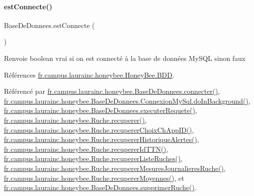 \paragraph{\texorpdfstring{est\+Connecte()}{estConnecte()}}
{\footnotesize\ttfamily Base\+De\+Donnees.\+est\+Connecte (\begin{DoxyParamCaption}{ }\end{DoxyParamCaption})}

\begin{DoxyReturn}{Renvoie}
boolean vrai si on est connecté à la base de données My\+S\+QL sinon faux 
\end{DoxyReturn}


Références \hyperlink{classfr_1_1campus_1_1laurainc_1_1honeybee_1_1_honey_bee_abfb4f6cc1c8bb793c37ccb8408abc51c}{fr.\+campus.\+laurainc.\+honeybee.\+Honey\+Bee.\+B\+DD}.



Référencé par \hyperlink{classfr_1_1campus_1_1laurainc_1_1honeybee_1_1_base_de_donnees_a08564ea7dccde161d6eac4b8879401bb}{fr.\+campus.\+laurainc.\+honeybee.\+Base\+De\+Donnees.\+connecter()}, \hyperlink{classfr_1_1campus_1_1laurainc_1_1honeybee_1_1_base_de_donnees_1_1_connexion_my_sql_a752c9f0f9a0879fceeeabd48c5fcb058}{fr.\+campus.\+laurainc.\+honeybee.\+Base\+De\+Donnees.\+Connexion\+My\+Sql.\+do\+In\+Background()}, \hyperlink{classfr_1_1campus_1_1laurainc_1_1honeybee_1_1_base_de_donnees_a421bffe6f14c01bee64695e7b6a9745d}{fr.\+campus.\+laurainc.\+honeybee.\+Base\+De\+Donnees.\+executer\+Requete()}, \hyperlink{classfr_1_1campus_1_1laurainc_1_1honeybee_1_1_ruche_a7a99d3c585f2c507eb2c6c265a5bb1fe}{fr.\+campus.\+laurainc.\+honeybee.\+Ruche.\+recuperer()}, \hyperlink{classfr_1_1campus_1_1laurainc_1_1honeybee_1_1_ruche_ade5d681bd0a29d84e0d069169b10a38b}{fr.\+campus.\+laurainc.\+honeybee.\+Ruche.\+recuperer\+Choix\+Ch\+App\+I\+D()}, \hyperlink{classfr_1_1campus_1_1laurainc_1_1honeybee_1_1_ruche_ace10a52a470257f2b8f161fc3c7b9f15}{fr.\+campus.\+laurainc.\+honeybee.\+Ruche.\+recuperer\+Historique\+Alertes()}, \hyperlink{classfr_1_1campus_1_1laurainc_1_1honeybee_1_1_ruche_a1113f3b4a527a801fdf50350667fd212}{fr.\+campus.\+laurainc.\+honeybee.\+Ruche.\+recuperer\+Id\+T\+T\+N()}, \hyperlink{classfr_1_1campus_1_1laurainc_1_1honeybee_1_1_ruche_aba0591cda391b907da41a0afeba4d59d}{fr.\+campus.\+laurainc.\+honeybee.\+Ruche.\+recuperer\+Liste\+Ruches()}, \hyperlink{classfr_1_1campus_1_1laurainc_1_1honeybee_1_1_ruche_a84de3c3af21b1cbeae2075e480acaabc}{fr.\+campus.\+laurainc.\+honeybee.\+Ruche.\+recuperer\+Mesures\+Journalieres\+Ruche()}, \hyperlink{classfr_1_1campus_1_1laurainc_1_1honeybee_1_1_ruche_a94f815b44f0d5d8682833d6b6e783713}{fr.\+campus.\+laurainc.\+honeybee.\+Ruche.\+recuperer\+Moyennes()}, et \hyperlink{classfr_1_1campus_1_1laurainc_1_1honeybee_1_1_base_de_donnees_a7b0977566d74684fab184f7a5efce3c8}{fr.\+campus.\+laurainc.\+honeybee.\+Base\+De\+Donnees.\+supprimer\+Ruche()}.


